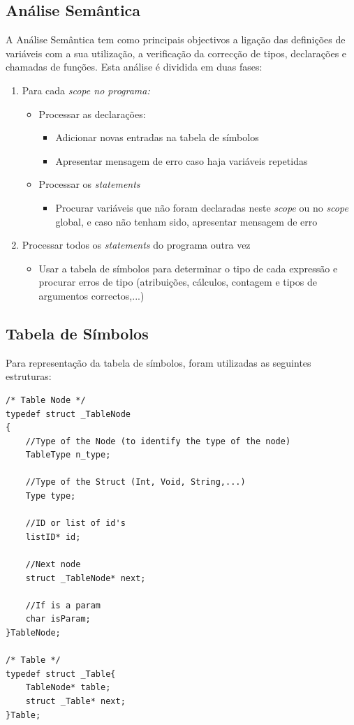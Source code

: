 \documentclass[12pt]{article}
\begin{document}
\subsection{Análise Semântica}
A Análise Semântica tem como principais objectivos a ligação das definições de variáveis com a sua utilização, a verificação da correcção de tipos, declarações e chamadas de funções.
Esta análise é dividida em duas fases:
\begin{enumerate}
	\item Para cada \emph{scope no programa:}
	\begin{itemize}
		\item Processar as declarações:
		\begin{itemize}
			\item Adicionar novas entradas na tabela de símbolos
			\item Apresentar mensagem de erro caso haja variáveis repetidas
		\end{itemize}
		\item Processar os \emph{statements}
		\begin{itemize}
			\item Procurar variáveis que não foram declaradas neste \emph{scope} ou no \emph{scope} global, e caso não tenham sido, apresentar mensagem de erro
		\end{itemize}
	\end{itemize}
	\item Processar todos os \emph{statements} do programa outra vez
	\begin{itemize}
		\item Usar a tabela de símbolos para determinar o tipo de cada expressão e procurar erros de tipo (atribuições, cálculos, contagem e tipos de argumentos correctos,...)
	\end{itemize}
\end{enumerate}

\subsection{Tabela de Símbolos}

Para representação da tabela de símbolos, foram utilizadas as seguintes estruturas:
\begin{lstlisting}
/* Table Node */
typedef struct _TableNode
{
    //Type of the Node (to identify the type of the node)
    TableType n_type;
    
    //Type of the Struct (Int, Void, String,...)
    Type type;
    
    //ID or list of id's
    listID* id;
    
    //Next node
    struct _TableNode* next;
    
    //If is a param
    char isParam;
}TableNode;

/* Table */
typedef struct _Table{
    TableNode* table;
    struct _Table* next;
}Table;

\end{lstlisting}
\end{document}
